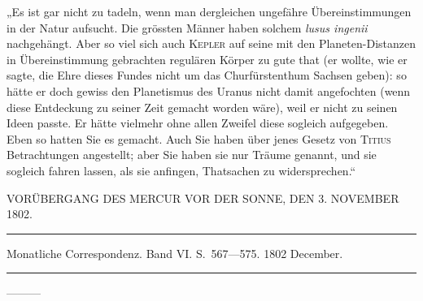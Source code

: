 „Es ist gar nicht zu tadeln, wenn man dergleichen ungefähre Übereinstimmungen in der Natur aufsucht. Die grössten Männer haben solchem \textit{lusus ingenii} nachgehängt. Aber so viel sich auch \textsc{Kepler} auf seine mit den Planeten-Distanzen in Übereinstimmung gebrachten regulären Körper zu gute that (er wollte, wie er sagte, die Ehre dieses Fundes nicht um das Churfürstenthum Sachsen geben): so hätte er doch gewiss den Planetismus des Uranus nicht damit angefochten (wenn diese Entdeckung zu seiner Zeit gemacht worden wäre), weil er nicht zu seinen Ideen passte. Er hätte vielmehr ohne allen Zweifel diese sogleich aufgegeben. Eben so hatten Sie es gemacht. Auch Sie haben über jenes Gesetz von \textsc{Titius} Betrachtungen angestellt; aber Sie haben sie nur Träume genannt, und sie sogleich fahren lassen, als sie anfingen, Thatsachen zu widersprechen.“
\begin{flushright}\end{flushright}

\newcommand{\MercurySymbol}{\text{\mdseries\AstroSymbols ☿}}
\bigskip{}
\begin{center}
VORÜBERGANG DES MERCUR VOR DER SONNE, DEN 3. NOVEMBER 1802.\par
\medskip\hrule\medskip
Monatliche Correspondenz. Band VI. S.\ 567—575. 1802 December.\par
\medskip\hrule
\end{center}\medskip
—\quad —\quad —

